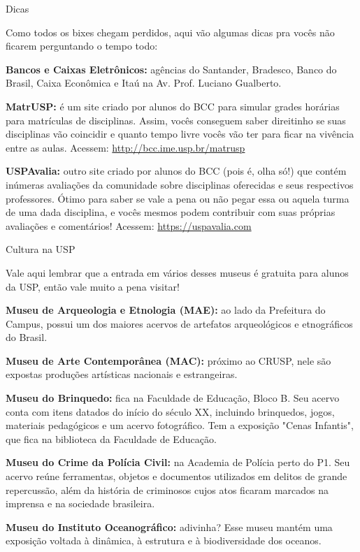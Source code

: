 \begin{secao}{Dicas}

Como todos os bixes chegam perdidos, aqui vão algumas dicas pra vocês não ficarem perguntando o tempo todo:

{\bf Bancos e Caixas Eletrônicos:} agências do Santander, Bradesco,
Banco do Brasil, Caixa Econômica e Itaú na Av. Prof. Luciano Gualberto. 

{\bf MatrUSP:} é um site criado por alunos do BCC para simular grades horárias
para matrículas de disciplinas. Assim, vocês conseguem saber direitinho se suas
disciplinas vão coincidir e quanto tempo livre vocês vão ter para ficar na
vivência entre as aulas. Acessem: \url{http://bcc.ime.usp.br/matrusp}

{\bf USPAvalia:} outro site criado por alunos do BCC (pois é, olha só!) que
contém inúmeras avaliações da comunidade sobre disciplinas oferecidas e
seus respectivos professores. Ótimo para saber se vale a pena ou não pegar
essa ou aquela turma de uma dada disciplina, e vocês mesmos podem contribuir com
suas próprias avaliações e comentários! Acessem: \url{https://uspavalia.com}

\begin{subsecao}{Cultura na USP}

Vale aqui lembrar que a entrada em vários desses museus é gratuita para alunos da
USP, então vale muito a pena visitar!

{\bf Museu de Arqueologia e Etnologia (MAE):} ao lado da Prefeitura do Campus,
possui um dos maiores acervos de artefatos arqueológicos e etnográficos do Brasil.

{\bf Museu de Arte Contemporânea (MAC):} próximo ao CRUSP, nele são expostas produções
artísticas nacionais e estrangeiras.

{\bf Museu do Brinquedo:} fica na Faculdade de Educação, Bloco B. Seu acervo conta 
com itens datados do início do século XX, incluindo brinquedos, jogos, materiais
pedagógicos e um acervo fotográfico. Tem a exposição "Cenas Infantis", que fica na
biblioteca da Faculdade de Educação.

{\bf Museu do Crime da Polícia Civil:} na Academia de Polícia perto do P1. Seu acervo
reúne ferramentas, objetos e documentos utilizados em delitos de grande repercussão, 
além da história de criminosos cujos atos ficaram marcados na imprensa e na sociedade
brasileira.

{\bf Museu do Instituto Oceanográfico:} adivinha? Esse museu mantém uma exposição voltada
à dinâmica, à estrutura e à biodiversidade dos oceanos.


\end{subsecao}
\end{secao}
